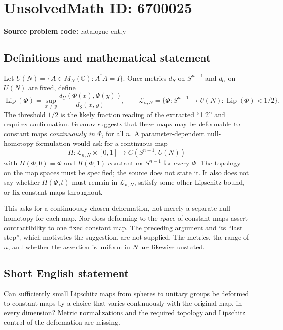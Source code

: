 \documentclass[11pt]{article}
\newcommand{\C}{\mathbb{C}}
\begin{document}
\section*{UnsolvedMath ID: 6700025}
\textbf{Source problem code:} catalogue entry
\subsection{Definitions and mathematical statement}
Let \(U(N)=\{A\in M_N(\C):A^*A=I\}\). Once metrics \(d_S\) on \(S^{n-1}\) and \(d_U\) on \(U(N)\) are fixed, define
\[
\operatorname{Lip}(\Phi)=\sup_{x\ne y}\frac{d_U(\Phi(x),\Phi(y))}{d_S(x,y)},\qquad
\mathcal L_{n,N}=\{\Phi:S^{n-1}\to U(N):\operatorname{Lip}(\Phi)<1/2\}.
\]
The threshold \(1/2\) is the likely fraction reading of the extracted ``1 2'' and requires confirmation. Gromov suggests that these maps may be deformable to constant maps \emph{continuously in \(\Phi\)}, for all \(n\). A parameter-dependent null-homotopy formulation would ask for a continuous map
\[
 H:\mathcal L_{n,N}\times[0,1]\longrightarrow C(S^{n-1},U(N))
\]
with \(H(\Phi,0)=\Phi\) and \(H(\Phi,1)\) constant on \(S^{n-1}\) for every \(\Phi\). The topology on the map spaces must be specified; the source does not state it. It also does not say whether \(H(\Phi,t)\) must remain in \(\mathcal L_{n,N}\), satisfy some other Lipschitz bound, or fix constant maps throughout.

This asks for a continuously chosen deformation, not merely a separate null-homotopy for each map. Nor does deforming to the \emph{space} of constant maps assert contractibility to one fixed constant map. The preceding argument and its ``last step'', which motivates the suggestion, are not supplied. The metrics, the range of \(n\), and whether the assertion is uniform in \(N\) are likewise unstated.
\subsection{Short English statement}
Can sufficiently small Lipschitz maps from spheres to unitary groups be deformed to constant maps by a choice that varies continuously with the original map, in every dimension? Metric normalizations and the required topology and Lipschitz control of the deformation are missing.
\end{document}
